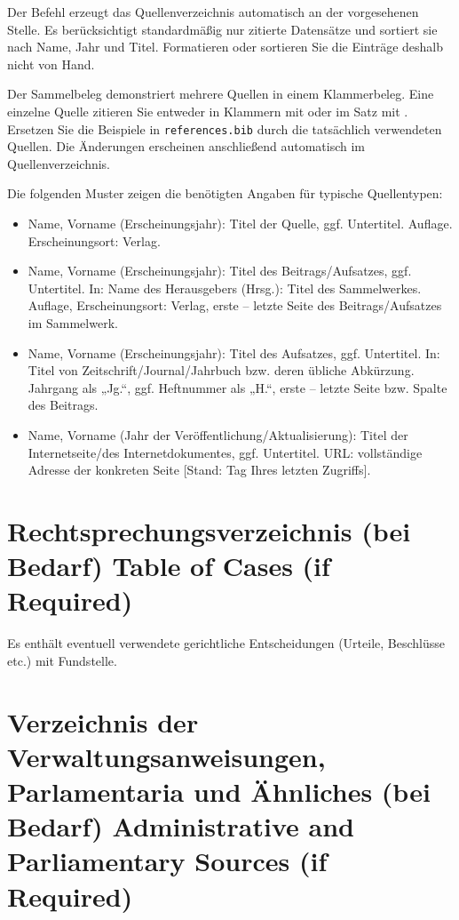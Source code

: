 Der Befehl \texttt{\string\printbibliography} erzeugt das
Quellenverzeichnis automatisch an der vorgesehenen Stelle. Es berücksichtigt
standardmäßig nur zitierte Datensätze und sortiert sie nach Name, Jahr und
Titel. Formatieren oder sortieren Sie die Einträge deshalb nicht von Hand.

Der Sammelbeleg
\parencite{booth2016,musterbeitrag2024,musteraufsatz2023,musteronline2025}
demonstriert mehrere Quellen in einem Klammerbeleg. Eine einzelne Quelle
zitieren Sie entweder in Klammern mit \parencite{booth2016} oder im Satz mit
\textcite{booth2016}. Ersetzen Sie die Beispiele in \texttt{references.bib}
durch die tatsächlich verwendeten Quellen. Die Änderungen erscheinen
anschließend automatisch im Quellenverzeichnis.

Die folgenden Muster zeigen die benötigten Angaben für typische Quellentypen:

\begin{itemize}
  \item Name, Vorname (Erscheinungsjahr): Titel der Quelle, ggf. Untertitel.
    Auflage. Erscheinungsort: Verlag.
  \item Name, Vorname (Erscheinungsjahr): Titel des Beitrags/Aufsatzes, ggf.
    Untertitel. In: Name des Herausgebers (Hrsg.): Titel des Sammelwerkes.
    Auflage, Erscheinungsort: Verlag, erste -- letzte Seite des
    Beitrags/Aufsatzes im Sammelwerk.
  \item Name, Vorname (Erscheinungsjahr): Titel des Aufsatzes, ggf. Untertitel.
    In: Titel von Zeitschrift/Journal/Jahrbuch bzw. deren übliche Abkürzung.
    Jahrgang als „Jg.“, ggf. Heftnummer als „H.“, erste -- letzte Seite bzw.
    Spalte des Beitrags.
  \item Name, Vorname (Jahr der Veröffentlichung/Aktualisierung): Titel der
    Internetseite/des Internetdokumentes, ggf. Untertitel. URL: vollständige
    Adresse der konkreten Seite [Stand: Tag Ihres letzten Zugriffs].
\end{itemize}

\section{\DEEN
  {Rechtsprechungsverzeichnis (bei Bedarf)}
  {Table of Cases (if Required)}}

Es enthält eventuell verwendete gerichtliche Entscheidungen (Urteile,
Beschlüsse etc.) mit Fundstelle.

\section{\DEEN
  {Verzeichnis der Verwaltungsanweisungen, Parlamentaria und Ähnliches
   (bei Bedarf)}
  {Administrative and Parliamentary Sources (if Required)}}

